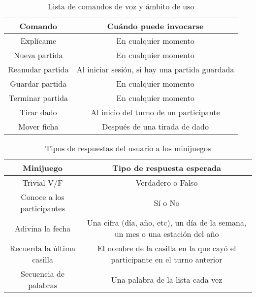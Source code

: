 \begin{table}[H]
	\centering
	\begin{tabular}{|c|c|}
		\hline
		\textbf{Comando} & \textbf{Cuándo puede invocarse}\\
		\hline
		Explícame & En cualquier momento \\
		\hline
		Nueva partida & En cualquier momento \\
		\hline
		Reanudar partida & Al iniciar sesión, si hay una partida guardada \\
		\hline
		Guardar partida & En cualquier momento \\
		\hline
		Terminar partida & En cualquier momento \\
		\hline
		Tirar dado & Al inicio del turno de un participante \\
		\hline
		Mover ficha & Después de una tirada de dado \\
		\hline
	\end{tabular}
	\caption{Lista de comandos de voz y ámbito de uso}
	\label{tab:comandos-voz}
\end{table}

\begin{table}[H]
	\centering
	\begin{tabular}{|c|c|}
		\hline
		\textbf{Minijuego} & \textbf{Tipo de respuesta esperada}\\
		\hline
		Trivial V/F & Verdadero o Falso \\
		\hline
		Conoce a los participantes & Sí o No \\
		\hline
		Adivina la fecha & Una cifra (día, año, etc), un día de la semana, un mes o una estación del año \\
		\hline
		Recuerda la última casilla & El nombre de la casilla en la que cayó el participante en el turno anterior \\
		\hline
		Secuencia de palabras & Una palabra de la lista cada vez \\
		\hline
	\end{tabular}
	\caption{Tipos de respuestas del usuario a los minijuegos}
	\label{tab:respuestas-minijuegos}
\end{table}

